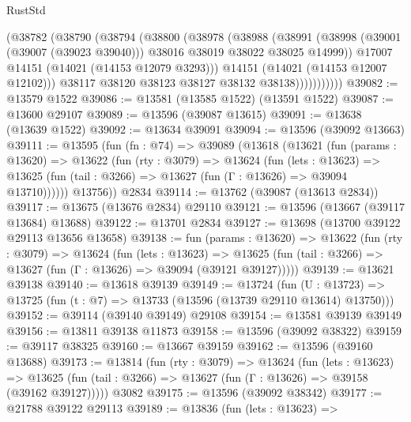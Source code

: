\begin{lexlean}{RustStd}
\begin{coremodule}
                  (@38782
                    (@38790
                      (@38794
                        (@38800
                          (@38978
                            (@38988
                              (@38991
                                (@38998
                                  (@39001 (@39007 (@39023 @39040)))
                                  @38016
                                  @38019
                                  @38022
                                  @38025
                                  @14999))
                              @17007
                              @14151
                              (@14021 (@14153 @12079 @3293)))
                            @14151
                            (@14021 (@14153 @12007 @12102)))
                          @38117
                          @38120
                          @38123
                          @38127
                          @38132
                          @38138)))))))))))
@39082 := @13579 @1522
@39086 := @13581 (@13585 @1522) (@13591 @1522)
@39087 := @13600 @29107
@39089 := @13596 (@39087 @13615)
@39091 := @13638 (@13639 @1522)
@39092 := @13634 @39091
@39094 := @13596 (@39092 @13663)
@39111 := @13595
    (fun (fn : @74) =>
    @39089
      (@13618
        (@13621
          (fun (params : @13620) =>
          @13622
            (fun (rty : @3079) =>
            @13624
              (fun (lets : @13623) =>
              @13625 (fun (tail : @3266) => @13627 (fun (Γ : @13626) => @39094 @13710))))))
        @13756))
    @2834
@39114 := @13762 (@39087 (@13613 @2834))
@39117 := @13675 (@13676 @2834) @29110
@39121 := @13596 (@13667 (@39117 @13684) @13688)
@39122 := @13701 @2834
@39127 := @13698 (@13700 @39122 @29113 @13656 @13658)
@39138 := fun (params : @13620) =>
  @13622
    (fun (rty : @3079) =>
    @13624
      (fun (lets : @13623) =>
      @13625 (fun (tail : @3266) => @13627 (fun (Γ : @13626) => @39094 (@39121 @39127)))))
@39139 := @13621 @39138
@39140 := @13618 @39139
@39149 := @13724
    (fun (U : @13723) => @13725 (fun (t : @7) => @13733 (@13596 (@13739 @29110 @13614) @13750)))
@39152 := @39114 (@39140 @39149) @29108
@39154 := @13581 @39139 @39149
@39156 := @13811 @39138 @11873
@39158 := @13596 (@39092 @38322)
@39159 := @39117 @38325
@39160 := @13667 @39159
@39162 := @13596 (@39160 @13688)
@39173 := @13814
    (fun (rty : @3079) =>
    @13624
      (fun (lets : @13623) =>
      @13625 (fun (tail : @3266) => @13627 (fun (Γ : @13626) => @39158 (@39162 @39127)))))
    @3082
@39175 := @13596 (@39092 @38342)
@39177 := @21788 @39122 @29113
@39189 := @13836
    (fun (lets : @13623) =>

\end{coremodule}
\end{lexlean}
